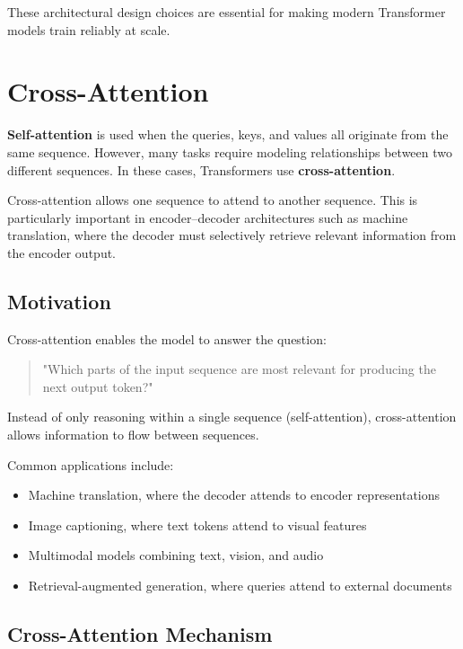 \documentclass[11pt]{article}
\begin{document}
These architectural design choices are essential for making modern Transformer models train reliably at scale.

\section{Cross-Attention}
\label{sec:cross-attention}

\textbf{Self-attention} is used when the queries, keys, and values all originate from the same sequence. However, many tasks require modeling relationships between two different sequences. In these cases, Transformers use \textbf{cross-attention}.

Cross-attention allows one sequence to attend to another sequence. This is particularly important in encoder–decoder architectures such as machine translation, where the decoder must selectively retrieve relevant information from the encoder output.

\subsection{Motivation}

Cross-attention enables the model to answer the question:

\begin{quote}
"Which parts of the input sequence are most relevant for producing the next output token?"
\end{quote}

Instead of only reasoning within a single sequence (self-attention), cross-attention allows information to flow between sequences.

Common applications include:

\begin{itemize}

\item Machine translation, where the decoder attends to encoder representations
\item Image captioning, where text tokens attend to visual features
\item Multimodal models combining text, vision, and audio
\item Retrieval-augmented generation, where queries attend to external documents

\end{itemize}

\subsection{Cross-Attention Mechanism}
\end{document}

